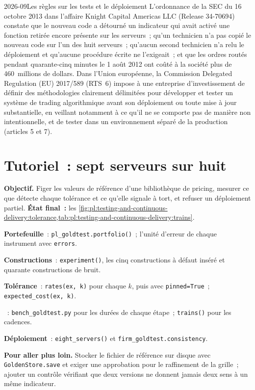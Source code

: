 \begin{dated}{2026-09}{Les règles sur les tests et le déploiement}\label{dat:pl:testing-and-continuous-delivery:rules}
L'ordonnance de la SEC du 16 octobre 2013 dans l'affaire Knight Capital Americas LLC (Release 34-70694) constate que le nouveau code a détourné un indicateur qui
avait activé une fonction retirée encore présente sur les serveurs~; qu'un technicien n'a pas copié le nouveau code sur l'un des huit
serveurs~; qu'aucun second technicien n'a relu le déploiement et qu'aucune procédure écrite ne l'exigeait~; et que les ordres routés pendant quarante-cinq minutes le 1 août
2012 ont coûté à la société plus de 460~millions de dollars. Dans l'Union européenne, la Commission Delegated Regulation (EU) 2017/589 (RTS~6) impose à une
entreprise d'investissement de définir des méthodologies clairement délimitées pour développer et tester un système de trading algorithmique avant son déploiement ou
toute mise à jour substantielle, en veillant notamment à ce qu'il ne se comporte pas de manière non intentionnelle, et de tester dans un environnement séparé
de la production (articles 5 et 7).
\end{dated}

\section{Tutoriel~: sept serveurs sur huit}\label{tut:pl:testing-and-continuous-delivery:tut}

\begin{tutorial}
\textbf{Objectif.} Figer les valeurs de référence d'une bibliothèque de pricing, mesurer ce que détecte chaque tolérance et ce qu'elle signale à tort, et refuser un
déploiement partiel. \textbf{État final~:} les \cref{fig:pl:testing-and-continuous-delivery:tolerance,tab:pl:testing-and-continuous-delivery:trains}.
\begin{tutsteps}
\item \textbf{Portefeuille}~: \texttt{pl\_goldtest.portfolio()}~; l'unité d'erreur de chaque instrument avec \texttt{errors}.
\item \textbf{Constructions}~: \texttt{experiment()}, les cinq constructions à défaut inséré et quarante constructions de bruit.
\item \textbf{Tolérance}~: \texttt{rates(ex, k)} pour chaque $k$, puis avec \texttt{pinned=True}~; \texttt{expected\_cost(ex, k)}.
\item \textbf{}~: \texttt{bench\_goldtest.py} pour les durées de chaque étape~; \texttt{trains()} pour les cadences.
\item \textbf{Déploiement}~: \texttt{eight\_servers()} et \texttt{firm\_goldtest.consistency}.
\end{tutsteps}
\textbf{Pour aller plus loin.} Stocker le fichier de référence sur disque avec \texttt{GoldenStore.save} et exiger une approbation pour le raffinement
de la grille~; ajouter un contrôle vérifiant que deux versions ne donnent jamais deux sens à un même indicateur.
\end{tutorial}


